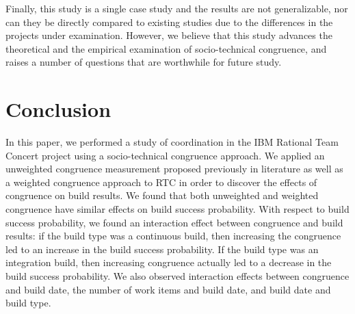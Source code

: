 Finally, this study is a single case study and the results are not generalizable, nor can they be directly compared to existing studies due to the differences in the projects under examination. However, we believe that this study advances the theoretical and the empirical examination of socio-technical congruence, and raises a number of questions that are worthwhile for future study.


\section{Conclusion}
\label{sec:conclusion}

In this paper, we performed a study of coordination in the IBM Rational Team Concert project using a
socio-technical congruence approach. We applied an unweighted congruence
measurement proposed previously in literature as well as a weighted congruence
approach to RTC in order to discover the effects of congruence on
build results. We found that both unweighted and weighted congruence have similar effects on build success probability. With respect to build success probability, we found an interaction effect between congruence
and build results: if the build type was a continuous build, then increasing the congruence led to an increase in the build success probability. If the build type was an integration build, then increasing congruence actually led to a decrease in the build success probability. We also observed interaction effects between congruence and build date, the number of work items and build date, and build date and build type.





